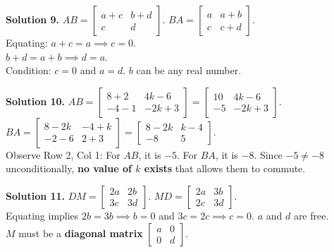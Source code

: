 \documentclass[11pt]{article}
\begin{document}
\vspace{0.2cm}\noindent\textbf{Solution 9.}
$AB = \begin{bmatrix} a+c & b+d \\ c & d \end{bmatrix}$. $BA = \begin{bmatrix} a & a+b \\ c & c+d \end{bmatrix}$.\\
Equating: $a+c = a \implies c = 0$.\\
$b+d = a+b \implies d = a$.\\
Condition: \textbf{$c = 0$} and \textbf{$a = d$}. $b$ can be any real number. 

\vspace{0.2cm}\noindent\textbf{Solution 10.}
$AB = \begin{bmatrix} 8+2 & 4k-6 \\ -4-1 & -2k+3 \end{bmatrix} = \begin{bmatrix} 10 & 4k-6 \\ -5 & -2k+3 \end{bmatrix}$.\\
$BA = \begin{bmatrix} 8-2k & -4+k \\ -2-6 & 2+3 \end{bmatrix} = \begin{bmatrix} 8-2k & k-4 \\ -8 & 5 \end{bmatrix}$.\\
Observe Row 2, Col 1: For $AB$, it is $-5$. For $BA$, it is $-8$. Since $-5 \neq -8$ unconditionally, \textbf{no value of $k$ exists} that allows them to commute.

\vspace{0.2cm}\noindent\textbf{Solution 11.}
$DM = \begin{bmatrix} 2a & 2b \\ 3c & 3d \end{bmatrix}$. $MD = \begin{bmatrix} 2a & 3b \\ 2c & 3d \end{bmatrix}$.\\
Equating implies $2b = 3b \implies b=0$ and $3c = 2c \implies c=0$. $a$ and $d$ are free.\\
$M$ must be a \textbf{diagonal matrix} $\begin{bmatrix} a & 0 \\ 0 & d \end{bmatrix}$.
\end{document}
